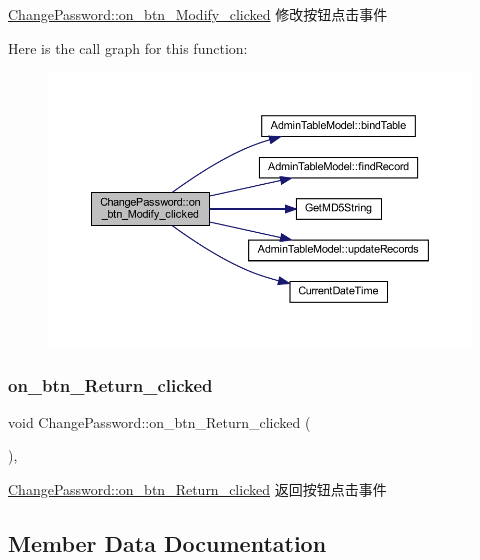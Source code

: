 \mbox{\hyperlink{class_change_password_a818333a3c3fbeb476314f5624016ba1e}{Change\+Password\+::on\+\_\+btn\+\_\+\+Modify\+\_\+clicked}} 修改按钮点击事件 

Here is the call graph for this function\+:
\nopagebreak
\begin{figure}[H]
\begin{center}
\leavevmode
\includegraphics[width=350pt]{class_change_password_a818333a3c3fbeb476314f5624016ba1e_cgraph}
\end{center}
\end{figure}
\mbox{\label{class_change_password_a84a88a0c8c00284e8c03ee4cbe748d45}} 
\subsubsection{\texorpdfstring{on\_btn\_Return\_clicked}{on\_btn\_Return\_clicked}}
{\footnotesize\ttfamily void Change\+Password\+::on\+\_\+btn\+\_\+\+Return\+\_\+clicked (\begin{DoxyParamCaption}{ }\end{DoxyParamCaption})\hspace{0.3cm}{\ttfamily [private]}, {\ttfamily [slot]}}



\mbox{\hyperlink{class_change_password_a84a88a0c8c00284e8c03ee4cbe748d45}{Change\+Password\+::on\+\_\+btn\+\_\+\+Return\+\_\+clicked}} 返回按钮点击事件 



\subsection{Member Data Documentation}
\mbox{\label{class_change_password_a57744b8d5341971b053cac27b66f923c}} 

